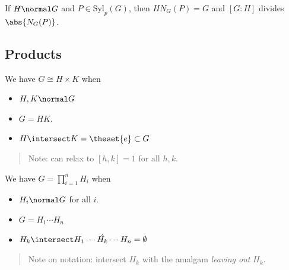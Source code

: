 \begin{theorem}

If \(H\normal G\) and \(P \in \mathrm{Syl}_p(G)\), then \(H N_G(P) = G\)
and \([G: H]\) divides \(\abs{N_G(P)}\).

\end{theorem}

\hypertarget{products}{%
\subsection{Products}\label{products}}

\begin{theorem}

We have \(G \cong H \times K\) when

\begin{itemize}
\item
  \(H, K \normal G\)
\item
  \(G = HK\).
\item
  \(H\intersect K = \theset{e} \subset G\)
\end{itemize}

\begin{quote}
Note: can relax to \([h,k] = 1\) for all \(h, k\).
\end{quote}

\end{theorem}

\begin{theorem}

We have \(G = \prod_{i=1}^n H_i\) when

\begin{itemize}
\item
  \(H_i \normal G\) for all \(i\).
\item
  \(G = H_1 \cdots H_n\)
\item
  \(H_k \intersect H_1 \cdots \hat{H_k} \cdots H_n = \emptyset\)
\end{itemize}

\begin{quote}
Note on notation: intersect \(H_k\) with the amalgam \emph{leaving out}
\(H_k\).
\end{quote}

\end{theorem}

